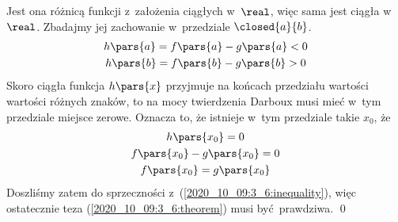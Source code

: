 Jest ona różnicą funkcji z~założenia ciągłych w~\(\real\), więc sama jest ciągła w~\(\real\). Zbadajmy jej zachowanie w~przedziale \(\closed{a}{b}\).
\begin{gather*}
    h\pars{a} = f\pars{a} - g\pars{a} < 0\\
    h\pars{b} = f\pars{b} - g\pars{b} > 0
\end{gather*}
Skoro ciągła funkcja \(h\pars{x}\) przyjmuje na końcach przedziału wartości wartości różnych znaków, to na mocy twierdzenia Darboux musi mieć w~tym przedziale miejsce zerowe. Oznacza to, że istnieje w~tym przedziale takie \(x_0\), że
\begin{gather*}
    h\pars{x_0} = 0\\
    f\pars{x_0} - g\pars{x_0} = 0\\
    f\pars{x_0} = g\pars{x_0}
\end{gather*}
Doszliśmy zatem do sprzeczności z~(\ref{2020_10_09:3_6:inequality}), więc ostatecznie teza (\ref{2020_10_09:3_6:theorem}) musi być prawdziwa.
\qed
